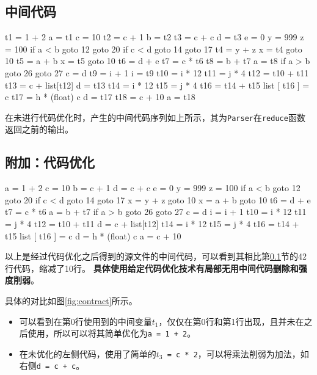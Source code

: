 \documentclass{ML}
\begin{document}
\subsection{中间代码}\label{sec:inner_code}
\begin{multicols}{2}
    \begin{textcode}
    t1 = 1 + 2
    a = t1
    c = 10
    t2 = c + 1
    b = t2
    t3 = c + c
    d = t3
    e = 0
    y = 999
    z = 100
    if a < b goto 12
    goto 20
    if c < d goto 14
    goto 17
    t4 = y + z
    x = t4
    goto 10
    t5 = a + b
    x = t5
    goto 10
    t6 = d + e
    t7 = c * t6
    t8 = b + t7
    a = t8
    if a > b goto 26
    goto 27
    c = d
    t9 = i + 1
    i = t9
    t10 = i * 12
    t11 = j * 4
    t12 = t10 + t11
    t13 = c + list[t12]
    d = t13
    t14 = i * 12
    t15 = j * 4
    t16 = t14 + t15
    list [ t16 ] = c
    t17 = h * (float) c
    d = t17
    t18 = c + 10
    a = t18
    \end{textcode}
\end{multicols}
在未进行代码优化时，产生的中间代码序列如上所示，其为\texttt{Parser}在\texttt{reduce}函数返回之前的输出。
\subsection{附加：代码优化}
\begin{multicols}{2}
    \begin{textcode}
    a = 1 + 2
    c = 10
    b = c + 1
    d = c + c
    e = 0
    y = 999
    z = 100
    if a < b goto 12
    goto 20
    if c < d goto 14
    goto 17
    x = y + z
    goto 10
    x = a + b
    goto 10
    t6 = d + e
    t7 = c * t6
    a = b + t7
    if a > b goto 26
    goto 27
    c = d
    i = i + 1
    t10 = i * 12
    t11 = j * 4
    t12 = t10 + t11
    d = c + list[t12]
    t14 = i * 12
    t15 = j * 4
    t16 = t14 + t15
    list [ t16 ] = c
    d = h * (float) c
    a = c + 10
    \end{textcode}
\end{multicols}
以上是经过代码优化之后得到的源文件的中间代码，可以看到其相比第\ref{sec:inner_code}节的42行代码，缩减了10行。
\textbf{具体使用给定代码优化技术有局部无用中间代码删除和强度削弱}。

具体的对比如图\ref{fig:contract}所示。
\begin{itemize}
    \item 可以看到在第0行使用到的中间变量$t_1$，仅仅在第0行和第1行出现，且并未在之后使用，所以可以将其简单优化为\texttt{a = 1 + 2}。
    \item 在未优化的左侧代码，使用了简单的\texttt{$t_3$ = c * 2}，可以将乘法削弱为加法，如右侧\texttt{d = c + c}。
\end{itemize}
\end{document}
